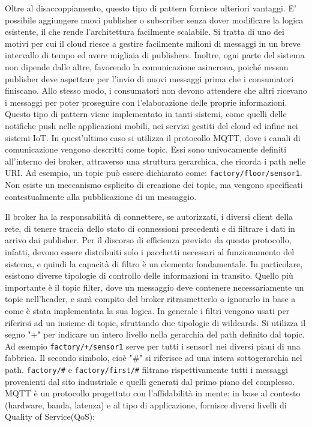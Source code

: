 \noindent Oltre al disaccoppiamento, questo tipo di pattern fornisce ulteriori vantaggi\cite{b9IoT4Arch}. E' possibile aggiungere nuovi publisher o subscriber senza dover modificare la logica esistente, il che rende l'architettura facilmente scalabile. Si tratta di uno dei motivi per cui il cloud riesce a gestire facilmente milioni di messaggi in un breve intervallo di tempo ed avere migliaia di publishers. Inoltre, ogni parte del sistema non dipende dalle altre, favorendo la comunicazione asincrona, poiché nessun publisher deve aspettare per l'invio di nuovi messaggi prima che i consumatori finiscano. Allo stesso modo, i consumatori non devono attendere che altri ricevano i messaggi per poter proseguire con l'elaborazione delle proprie informazioni. Questo tipo di pattern viene implementato in tanti sistemi, come quelli delle notifiche push nelle applicazioni mobili, nei servizi gestiti del cloud ed infine nei sistemi IoT. In quest'ultimo caso si utilizza il protocollo MQTT, dove i canali di comunicazione vengono descritti come topic. Essi sono univocamente definiti all'interno dei broker, attraverso una struttura gerarchica, che ricorda i path nelle URI. Ad esempio, un topic può essere dichiarato come: \texttt{factory/floor/sensor1}. Non esiste un meccanismo esplicito di creazione dei topic, ma vengono specificati contestualmente alla pubblicazione di un messaggio.

Il broker ha la responsabilità di connettere, se autorizzati, i diversi client della rete, di tenere traccia dello stato di connessioni precedenti e di filtrare i dati in arrivo dai publisher. Per il discorso di efficienza previsto da questo protocollo, infatti, devono essere distribuiti solo i pacchetti necessari al funzionamento del sistema, e quindi la capacità di filtro è un elemento fondamentale. In particolare, esistono diverse tipologie di controllo delle informazioni in transito. Quello più importante è il topic filter, dove un messaggio deve contenere necessariamente un topic nell'header, e sarà compito del broker ritrasmetterlo o ignorarlo in base a come è stata implementata la sua logica. In generale i filtri vengono usati per riferirsi ad un insieme di topic, sfruttando due tipologie di wildcards. Si utilizza il segno "+" per indicare un intero livello nella gerarchia del path definito dal topic. Ad esempio \texttt{factory/+/sensor1} serve per tutti i sensor1 nei diversi piani di una fabbrica. Il secondo simbolo, cioè "\#" si riferisce ad una intera sottogerarchia nel path. \texttt{factory/\#} e \texttt{factory/first/\#} filtrano rispettivamente tutti i messaggi provenienti dal sito industriale e quelli generati dal primo piano del complesso. MQTT è un protocollo progettato con l'affidabilità in mente: in base al contesto (hardware, banda, latenza) e al tipo di applicazione, fornisce diversi livelli di Quality of Service(QoS):

